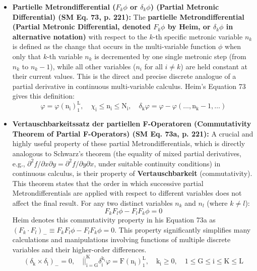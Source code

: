 \documentclass[12pt]{article}
\begin{document}
\begin{itemize}
    \item \textbf{Partielle Metrondifferential (\( F_k\phi \) or \( \delta_k\phi \)) (Partial Metronic Differential) (SM Eq. 73, p. 221):}
    The \textbf{partielle Metrondifferential (Partial Metronic Differential, denoted \( F_k\phi \) by Heim, or \( \delta_k\phi \) in alternative notation)} with respect to the \( k \)-th specific metronic variable \( n_k \) is defined as the change that occurs in the multi-variable function \( \phi \) when only that \( k \)-th variable \( n_k \) is decremented by one single metronic step (from \( n_k \) to \( n_k-1 \)), while all other variables (\( n_i \) for all \( i \neq k \)) are held constant at their current values. This is the direct and precise discrete analogue of a partial derivative in continuous multi-variable calculus. Heim's Equation 73 gives this definition:
    \begin{equation}
    \varphi = \varphi(\mathrm{n_i})_1^\mathrm{L}, \quad \chi_\mathrm{i} \le \mathrm{n_i} \le \mathrm{N_i}, \quad \delta_{\mathrm{k}}\varphi = \varphi - \varphi(\dots, \mathrm{n_k}-1, \dots) \tag{73}
    \label{eq:original_partial_metrondifferential}
    \end{equation}

    \item \textbf{Vertauschbarkeitssatz der partiellen F-Operatoren (Commutativity Theorem of Partial F-Operators) (SM Eq. 73a, p. 221):}
    A crucial and highly useful property of these partial Metrondifferentials, which is directly analogous to Schwarz's theorem (the equality of mixed partial derivatives, e.g., \( \partial^2f/\partial x \partial y = \partial^2f/\partial y \partial x \), under suitable continuity conditions) in continuous calculus, is their property of \textbf{Vertauschbarkeit} (commutativity). This theorem states that the order in which successive partial Metrondifferentials are applied with respect to different variables does not affect the final result. For any two distinct variables \( n_k \) and \( n_l \) (where \( k \neq l \)):
    \[ F_k F_l \phi - F_l F_k \phi = 0 \]
    Heim denotes this commutativity property in his Equation 73a as \( (F_k \cdot F_l)_- \equiv F_k F_l \phi - F_l F_k \phi = 0 \). This property significantly simplifies many calculations and manipulations involving functions of multiple discrete variables and their higher-order differences.
    \begin{equation}
    (\delta_{\mathrm{k}} \times \delta_{\mathrm{l}})_- = 0, \quad \overline{||}_{\mathrm{i=G}}^{\mathrm{K}} \delta_{\mathrm{i}}^{\mathrm{k_i}} \varphi = \mathrm{F}(\mathrm{n_i})_1^\mathrm{L}, \quad \mathrm{k_i} \ge 0, \quad 1 \le \mathrm{G} \le \mathrm{i} \le \mathrm{K} \le \mathrm{L} \tag{73a}
    \end{equation}


\end{itemize}
\end{document}

